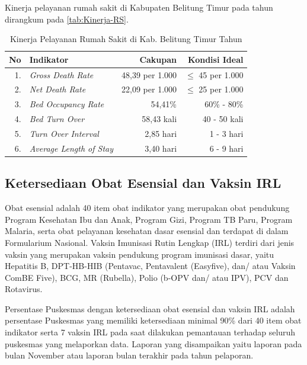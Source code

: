Kinerja pelayanan rumah sakit di Kabupaten Belitung Timur pada tahun \tP dirangkum pada \autoref{tab:Kinerja-RS}.

\begin{table}[!ht]
\caption{Kinerja Pelayanan Rumah Sakit di Kab. Belitung Timur Tahun \tP}
\label{tab:Kinerja-RS}
\centering{}%

\begin{tabular}{rlrr}
	\toprule
	                   No & Indikator                     &     Cakupan \tP &       Kondisi Ideal \\ 
	\midrule
	                   1. & \emph{Gross Death Rate}       & 48,39 per 1.000 & $\leq$ 45 per 1.000 \\
	\rowcolor{black!10}2. & \emph{Net Death Rate}         & 22,09 per 1.000 & $\leq$ 25 per 1.000 \\
	                   3. & \emph{Bed Occupancy Rate}     &         54,41\% &         60\% - 80\% \\
	\rowcolor{black!10}4. & \emph{Bed Turn Over}          &      58,43 kali &        40 - 50 kali \\
	                   5. & \emph{Turn Over Interval}     &       2,85 hari &          1 - 3 hari \\
	\rowcolor{black!10}6. & \emph{Average Length of Stay} &       3,40 hari &          6 - 9 hari \\ 
	\bottomrule
\end{tabular}
\end{table}

\subsection{Ketersediaan Obat Esensial dan Vaksin IRL}

Obat esensial adalah 40 item obat indikator yang merupakan obat pendukung Program Kesehatan Ibu dan Anak, Program Gizi, Program TB Paru, Program Malaria, serta obat pelayanan kesehatan dasar esensial dan terdapat di dalam Formularium Nasional. Vaksin Imunisasi Rutin Lengkap (IRL) terdiri dari jenis vaksin yang merupakan vaksin pendukung program imunisasi dasar, yaitu Hepatitis B, DPT-HB-HIB (Pentavac, Pentavalent (Easyfive), dan/ atau Vaksin ComBE Five), BCG, MR (Rubella), Polio (b-OPV dan/ atau IPV), PCV dan Rotavirus.

Persentase Puskesmas dengan ketersediaan obat esensial dan vaksin IRL adalah persentase Puskesmas yang memiliki ketersediaan minimal 90\% dari 40 item obat indikator serta 7 vaksin IRL pada saat dilakukan pemantauan terhadap seluruh puskesmas yang melaporkan data. Laporan yang disampaikan yaitu laporan pada bulan November atau laporan bulan terakhir pada tahun pelaporan.


